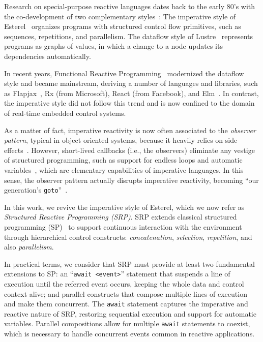 \documentclass{acm_proc_article-sp}
\newcommand{\code}[1] {{\small{\texttt{#1}}}}
\newcommand{\1}{\;}
\newcommand{\2}{\;\;}
\newcommand{\3}{\;\;\;}
\newcommand{\5}{\;\;\;\;\;}
\begin{document}
Research on special-purpose reactive languages dates back to the early 80's 
with the co-development of two complementary 
styles~\cite{rp.twelve,rp.hypothesis}:
%
The imperative style of Esterel~\cite{esterel.ieee91} organizes programs with 
structured control flow primitives, such as sequences, repetitions, and 
parallelism.
%
The dataflow style of Lustre~\cite{lustre.ieee91} represents programs as graphs 
of values, in which a change to a node updates its dependencies automatically.

In recent years, Functional Reactive Programming~\cite{frp.principles} 
modernized the dataflow style and became mainstream, deriving a number of 
languages and libraries, such as Flapjax~\cite{frp.flapjax}, Rx (from 
Microsoft), React (from Facebook), and Elm~\cite{frp.elm}.
%
In contrast, the imperative style did not follow this trend and is now confined 
to the domain of real-time embedded control systems.

As a matter of fact, imperative reactivity is now often associated to the 
\emph{observer pattern}, typical in object oriented systems, because it heavily 
relies on side effects~\cite{rp.deprecating,rp.rescala}.
%
However, short-lived callbacks (i.e., the observers) eliminate any vestige of 
structured programming, such as support for endless loops and automatic 
variables~\cite{sync_async.cooperative}, which are elementary capabilities of 
imperative languages.
%
In this sense, the observer pattern actually disrupts imperative reactivity, 
becoming ``our generation's \code{goto}''~\cite{dij.goto,rp.goto,elm.goto}.

In this work, we revive the imperative style of Esterel, which we now refer as 
\emph{Structured Reactive Programming (SRP)}.
%
SRP extends classical structured programming (SP)~\cite{dij.notes} to support 
continuous interaction with the environment through hierarchical control 
constructs: \emph{concatenation}, \emph{selection}, \emph{repetition}, and also 
\emph{parallelism}.

In practical terms, we consider that SRP must provide at least two fundamental 
extensions to SP:
an ``\code{await <event>}'' statement that suspends a line of execution until 
the referred event occurs, keeping the whole data and control context alive;
and parallel constructs that compose multiple lines of execution and make them 
concurrent.
%
The \code{await} statement captures the imperative and reactive nature of SRP, 
restoring sequential execution and support for automatic variables.
Parallel compositions allow for multiple \code{await} statements to coexist, 
which is necessary to handle concurrent events common in reactive applications.
\end{document}
